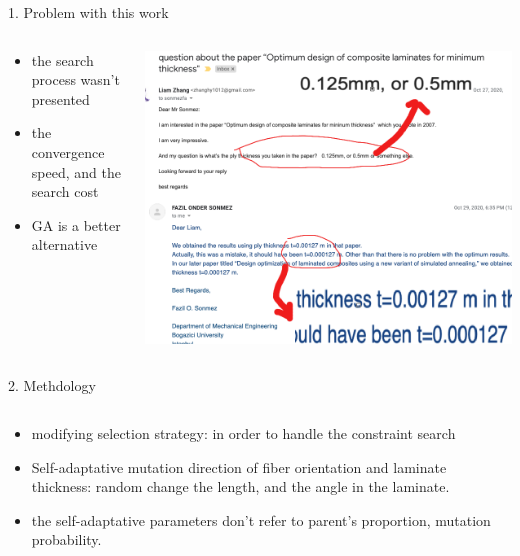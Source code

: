 \documentclass{beamer}
\begin{document}
\begin{frame}{1. Problem with this work}
\begin{columns}[c]
    \begin{column}{0.4\textwidth}
        \begin{itemize}
			\item the search process wasn't presented
			\item the convergence speed, and the search cost
			\item GA is a better alternative
        \end{itemize}
    \end{column}

    \begin{column}{0.6\textwidth}
        \begin{center}
            \includegraphics[width=1.0\linewidth]{2020-11-10-pre-image/email.png}
        \end{center}
    \end{column}
\end{columns}


\end{frame}
\begin{frame}{2. Methdology}
    \begin{columns}[c]
    \begin{column}{1\textwidth}
		\begin{itemize}
			\item modifying selection strategy: in order to handle the constraint search
			\item Self-adaptative mutation direction of fiber orientation and laminate thickness:
				random change the length, and the angle in the laminate.
			\item the self-adaptative parameters don't refer to parent's proportion, mutation
				probability.
		\end{itemize}
    \end{column}
    \begin{column}{0.8\textwidth}

    \end{column}
\end{columns}
\end{frame}
\end{document}
